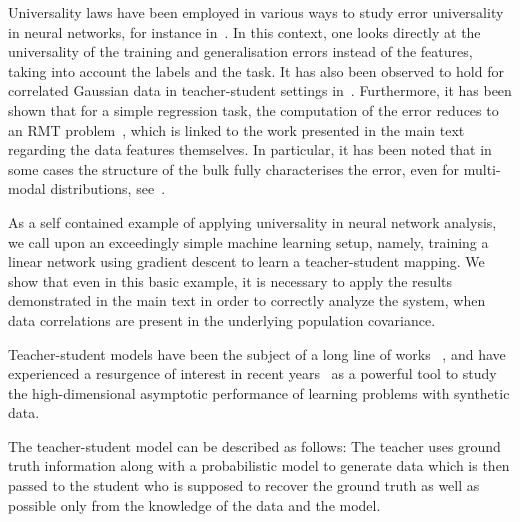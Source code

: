 \documentclass{article}
\begin{document}
\newcommand{\training}{\mathrm{tr}}
\newcommand{\gen}{\mathrm{gen}}
\newcommand{\dout}{d_\mathrm{out}}
\newcommand{\din}{d_\mathrm{in}}
\newcommand{\pop}{\mathrm{pop} }


Universality laws have been employed in various ways to study error universality in neural networks, for instance in~\cite{MeiMontanari2022,Gerace2020,Goldt2022,hu2022universality}.
In this context, one looks directly at the universality of the training and generalisation
errors instead of the features, taking into account the labels and the task. 
It has also been observed to hold for correlated Gaussian data in teacher-student settings in~\cite{Loureiro2021}.
Furthermore, it has been shown that for a simple regression task, the
computation of the error reduces to an RMT problem~\cite{Wei2022}, which is linked to the work presented in the main text regarding the data features themselves.
In particular, it has been
noted that in some cases the structure of the bulk fully characterises the error, even for multi-modal
distributions, see~\cite{Gerace2023,Pesce2023}.


As a self contained example of applying universality in neural network analysis, we call upon an exceedingly simple machine learning setup, namely, training a linear network using gradient descent to learn a teacher-student mapping. We show that even in this basic example, it is necessary to apply the results demonstrated in the main text in order to correctly analyze 
the system, when data correlations are present in the underlying population covariance.

Teacher-student models have been the subject
of a long line of works~\citep{seung1992statistical,watkin1993statistical, engel2001statistical,donoho1995statistical,el2013robust, saxe2014exact, zdeborova2016statistical,donoho2016high}
, and have experienced a resurgence of interest in recent years~\citep{mei2019generalization,hastie2019surprises,candes2020phase,aubin2020generalization,salehi2020performance} as a powerful tool to study the high-dimensional asymptotic performance of learning problems with synthetic data.

The teacher-student model
can be described as follows: The teacher uses ground truth information along with a probabilistic model to generate
data which is then passed to the student
who is supposed to recover the ground truth as well as possible only from the knowledge of the data and the model.
\end{document}
